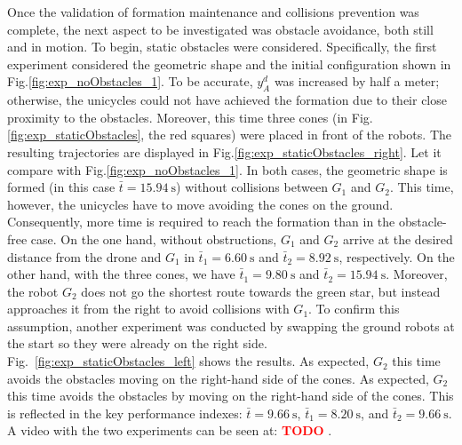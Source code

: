 \documentclass{ifacconf}
\newcommand{\TODO}[1]{
\textcolor{red}{\textbf{TODO} #1}
}
\begin{document}
Once the validation of formation maintenance and collisions 
prevention was complete, the next aspect to be investigated 
was obstacle avoidance, both still and in motion.
To begin, static obstacles were considered.
Specifically, the first experiment considered the geometric 
shape and the initial configuration shown in Fig.\ref{fig:exp_noObstacles_1}.
To be accurate, $y^d_A$ was increased by half a meter; otherwise, 
the unicycles could not have achieved the formation 
due to their close proximity to the obstacles.
Moreover, this time three cones (in Fig.\ref{fig:exp_staticObstacles}, the red squares)
were placed in front of the robots.
The resulting trajectories are displayed in Fig.\ref{fig:exp_staticObstacles_right}.
Let it compare with Fig.\ref{fig:exp_noObstacles_1}.
In both cases, the geometric shape is formed (in this case $\bar{t} = \SI{15.94}{\second}$)
without collisions between $G_1$ and $G_2$.
This time, however, the unicycles have to move avoiding the cones on the ground.
Consequently, more time is required to reach the formation than 
in the obstacle-free case.
On the one hand, without obstructions, $G_1$ and $G_2$ arrive at the desired distance 
from the drone and $G_1$ in $\bar{t}_1 = \SI{6.60}{\second}$ 
and $\bar{t}_2 = \SI{8.92}{\second}$, respectively.
On the other hand, with the three cones, we have 
$\bar{t}_1 = \SI{9.80}{\second}$ 
and $\bar{t}_2 = \SI{15.94}{\second}$.
Moreover, the robot $G_2$ does not go the shortest route towards 
the green star, but instead approaches it from the right to avoid 
collisions with $G_1$.
To confirm this assumption, another experiment was conducted by swapping
the ground robots at the start so they were already on the right side.
Fig.~\ref{fig:exp_staticObstacles_left} shows the results.
As expected, $G_2$ this time avoids the obstacles moving on 
the right-hand side of the cones.
As expected, $G_2$ this time avoids the obstacles by moving on 
the right-hand side of the cones. 
This is reflected in the key performance indexes:
$\bar{t} = \SI{9.66}{\second}$,
$\bar{t}_1 = \SI{8.20}{\second}$, and $\bar{t}_2 = \SI{9.66}{\second}$.
A video with the two experiments can be seen at:\TODO{}.
\end{document}
